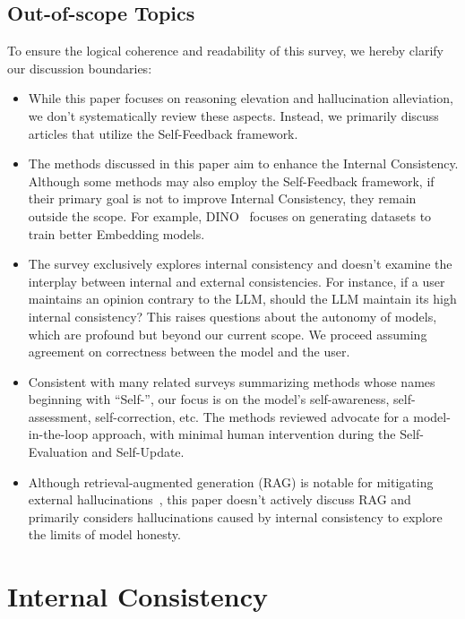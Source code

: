 \documentclass[lettersize,journal]{IEEEtran}
\begin{document}
\subsection{Out-of-scope Topics} \label{sec:out_of_scope}


\noindent To ensure the logical coherence and readability of this survey, we hereby clarify our discussion boundaries:

\begin{itemize}
    \item While this paper focuses on reasoning elevation and hallucination alleviation, we don't systematically review these aspects. Instead, we primarily discuss articles that utilize the Self-Feedback framework.
    \item The methods discussed in this paper aim to enhance the Internal Consistency. Although some methods may also employ the Self-Feedback framework, if their primary goal is not to improve Internal Consistency, they remain outside the scope. For example, DINO~\cite{DINO} focuses on generating datasets to train better Embedding models.
    \item The survey exclusively explores internal consistency and doesn't examine the interplay between internal and external consistencies. For instance, if a user maintains an opinion contrary to the LLM, should the LLM maintain its high internal consistency? This raises questions about the autonomy of models, which are profound but beyond our current scope. We proceed assuming agreement on correctness between the model and the user.
    \item Consistent with many related surveys summarizing methods whose names beginning with ``Self-'', our focus is on the model's self-awareness, self-assessment, self-correction, etc. The methods reviewed advocate for a model-in-the-loop approach, with minimal human intervention during the Self-Evaluation and Self-Update.
    \item Although retrieval-augmented generation (RAG) is notable for mitigating external hallucinations~\cite{gao2023retrievalaugmented}, this paper doesn't actively discuss RAG and primarily considers hallucinations caused by internal consistency to explore the limits of model honesty.
\end{itemize}


\section{Internal Consistency} \label{sec:internal_consistency}
\end{document}
